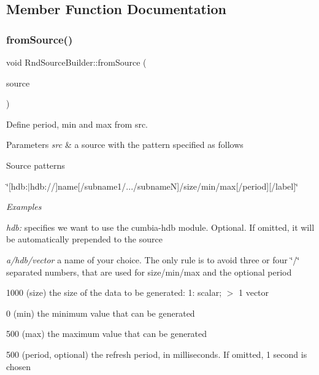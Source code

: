 \subsection{Member Function Documentation}
\mbox{\label{classRndSourceBuilder_a8fa3351fb620dbc70923f10f66109fd8}} 
\subsubsection{fromSource()}
{\footnotesize\ttfamily void Rnd\+Source\+Builder\+::from\+Source (\begin{DoxyParamCaption}\item[{const Q\+String \&}]{source }\end{DoxyParamCaption})}



Define period, min and max from src. 


\begin{DoxyParams}{Parameters}
{\em src} & a source with the pattern specified as follows\\
\hline
\end{DoxyParams}
\begin{DoxyParagraph}{Source patterns}
\begin{DoxyItemize}
\item \char`\"{}[hdb\+:$\vert$hdb\+://]name[/subname1/.../subname\+N]/size/min/max[/period][/label]\char`\"{}\end{DoxyItemize}
{\itshape Examples} 
\begin{DoxyCode}{0}
\end{DoxyCode}

\end{DoxyParagraph}
\begin{DoxyItemize}
\item {\itshape hdb\+:} specifies we want to use the cumbia-\/hdb module. Optional. If omitted, it will be automatically prepended to the source \item {\itshape a/hdb/vector} a name of your choice. The only rule is to avoid three or four \char`\"{}/\char`\"{} separated numbers, that are used for size/min/max and the optional period \item 1000 (size) the size of the data to be generated\+: 1\+: scalar; $>$ 1 vector \item 0 (min) the minimum value that can be generated \item 500 (max) the maximum value that can be generated \item 500 (period, optional) the refresh period, in milliseconds. If omitted, 1 second is chosen\end{DoxyItemize}

